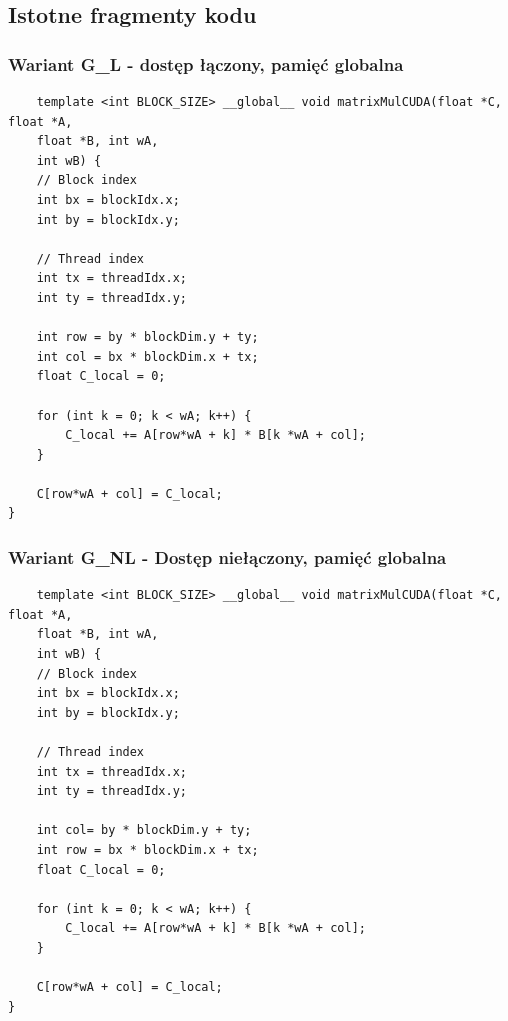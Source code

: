 \documentclass[10pt,a4paper]{article}
\begin{document}
\newpage

\subsection{Istotne fragmenty kodu}
\subsubsection*{Wariant G\_L - dostęp łączony, pamięć globalna}
\begin{lstlisting}
	template <int BLOCK_SIZE> __global__ void matrixMulCUDA(float *C, float *A,
	float *B, int wA,
	int wB) {
	// Block index
	int bx = blockIdx.x;
	int by = blockIdx.y;

	// Thread index
	int tx = threadIdx.x;
	int ty = threadIdx.y;

	int row = by * blockDim.y + ty;
	int col = bx * blockDim.x + tx;
	float C_local = 0;

	for (int k = 0; k < wA; k++) {
		C_local += A[row*wA + k] * B[k *wA + col];
	}

	C[row*wA + col] = C_local;
}
\end{lstlisting}

\subsubsection*{Wariant G\_NL - Dostęp niełączony, pamięć globalna}
\begin{lstlisting}
	template <int BLOCK_SIZE> __global__ void matrixMulCUDA(float *C, float *A,
	float *B, int wA,
	int wB) {
	// Block index
	int bx = blockIdx.x;
	int by = blockIdx.y;

	// Thread index
	int tx = threadIdx.x;
	int ty = threadIdx.y;

	int col= by * blockDim.y + ty;
	int row = bx * blockDim.x + tx;
	float C_local = 0;

	for (int k = 0; k < wA; k++) {
		C_local += A[row*wA + k] * B[k *wA + col];
	}

	C[row*wA + col] = C_local;
}
\end{lstlisting}

\newpage
\end{document}
